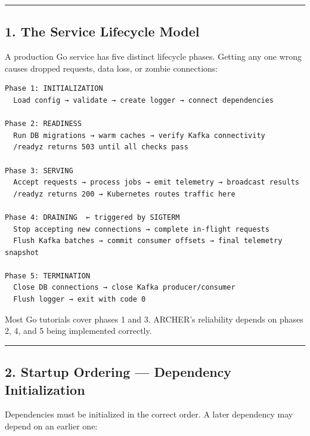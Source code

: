\documentclass[
]{article}
\begin{document}
\begin{center}\rule{0.5\linewidth}{0.5pt}\end{center}

\hypertarget{the-service-lifecycle-model}{%
\subsection{1. The Service Lifecycle
Model}\label{the-service-lifecycle-model}}

A production Go service has five distinct lifecycle phases. Getting any
one wrong causes dropped requests, data loss, or zombie connections:

\begin{verbatim}
Phase 1: INITIALIZATION
  Load config → validate → create logger → connect dependencies

Phase 2: READINESS
  Run DB migrations → warm caches → verify Kafka connectivity
  /readyz returns 503 until all checks pass

Phase 3: SERVING
  Accept requests → process jobs → emit telemetry → broadcast results
  /readyz returns 200 → Kubernetes routes traffic here

Phase 4: DRAINING  ← triggered by SIGTERM
  Stop accepting new connections → complete in-flight requests
  Flush Kafka batches → commit consumer offsets → final telemetry snapshot

Phase 5: TERMINATION
  Close DB connections → close Kafka producer/consumer
  Flush logger → exit with code 0
\end{verbatim}

Most Go tutorials cover phases 1 and 3. ARCHER's reliability depends on
phases 2, 4, and 5 being implemented correctly.

\begin{center}\rule{0.5\linewidth}{0.5pt}\end{center}

\hypertarget{startup-ordering-dependency-initialization}{%
\subsection{2. Startup Ordering --- Dependency
Initialization}\label{startup-ordering-dependency-initialization}}

Dependencies must be initialized in the correct order. A later
dependency may depend on an earlier one:
\end{document}
